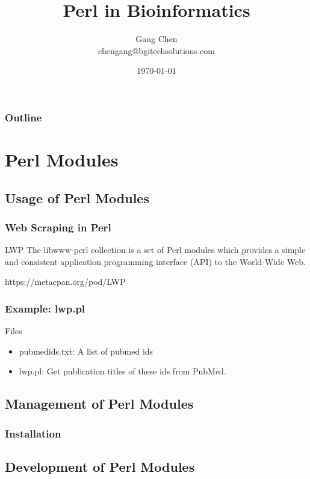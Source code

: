 \documentclass[UTF8]{beamer}
\title{Perl in Bioinformatics}
\author{Gang Chen\\ chengang@bgitechsolutions.com}
\date{\today}
\begin{document}
\begin{frame}
\titlepage
\end{frame}
\begin{frame}[t]\frametitle{Outline}
\tableofcontents[hideallsubsections]
\end{frame}

\section{Perl Modules}

\subsection{Usage of Perl Modules}

\begin{frame}
  \frametitle{Web Scraping in Perl}
  \begin{block}{LWP}
    The libwww-perl collection is a set of Perl modules which provides a simple
    and consistent application programming interface (API) to the World-Wide Web.

    https://metacpan.org/pod/LWP
  \end{block}
\end{frame}

\begin{frame}
  \frametitle{Example: lwp.pl}
\begin{block}{Files}
  \begin{itemize}
    \item pubmedids.txt: A list of pubmed ids
    \item lwp.pl: Get publication titles of these ids from PubMed.
  \end{itemize}
\end{block}
\end{frame}

\subsection{Management of Perl Modules}

\begin{frame}
  \frametitle{Installation}
\end{frame}



\subsection{Development of Perl Modules}
\end{document}
